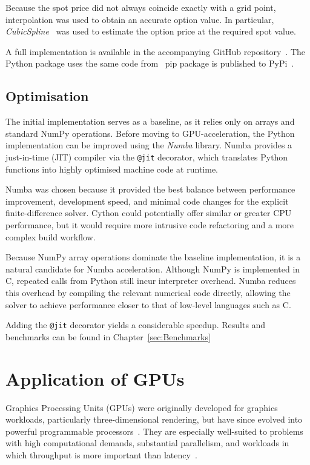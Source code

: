 \documentclass[11pt]{report}
\begin{document}
Because the spot price did not always coincide exactly with a grid point,
interpolation was used to obtain an accurate option value. 
In particular, \textit{CubicSpline}~\cite{2020SciPy-NMeth,scipy-cubicspline-docs} was used to estimate the option price at the required spot value.

A full implementation is available in the accompanying GitHub repository~\cite{yalcin_finalyearproject}.
The Python package uses the same code from~\cite{yalcin_finalyearproject} pip package is published to PyPi~\cite{yalcin2026bse}.

\subsection{Optimisation}\label{sec:PythonOpt}
The initial implementation serves as a baseline, as it relies only on arrays and standard NumPy operations. 
Before moving to GPU-acceleration, the Python implementation can be improved using the \textit{Numba} library. 
Numba provides a just-in-time (JIT) compiler via the \texttt{@jit} decorator, which translates Python functions into highly optimised machine code at runtime.

Numba was chosen because it provided the best balance 
between performance improvement, development speed, 
and minimal code changes for the explicit finite-difference
solver. Cython could potentially offer similar or greater 
CPU performance, but it would require more intrusive code 
refactoring and a more complex build workflow. 

Because NumPy array operations dominate the baseline implementation, 
it is a natural candidate for Numba acceleration.
Although NumPy is implemented in C, repeated calls from Python still incur interpreter overhead. 
Numba reduces this overhead by compiling the relevant numerical code directly, 
allowing the solver to achieve performance closer to that of low-level languages such as C.

Adding the \texttt{@jit} decorator yields a considerable speedup.
Results and benchmarks can be found in Chapter~\ref{sec:Benchmarks}

\section{Application of GPUs}
Graphics Processing Units (GPUs) were originally developed for graphics workloads, 
particularly three-dimensional rendering, but have since evolved into powerful programmable processors~\cite{Mantas2016}. 
They are especially well-suited to problems with high computational demands, 
substantial parallelism, and workloads in which throughput is more important than latency~\cite{Owens2008GraphicsPU}.
\end{document}
